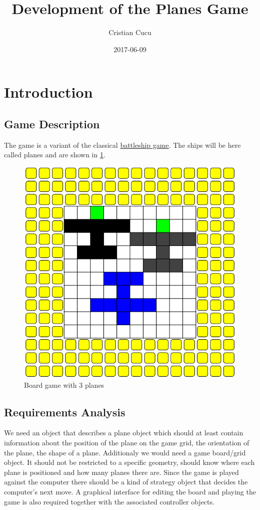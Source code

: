 \documentclass{article}
\title{Development of the Planes Game}
\date{2017-06-09}
\author{Cristian Cucu}
\begin{document}
\maketitle
\newpage
\lstset{language=C++}
\section{Introduction}

\subsection{Game Description}
The game is a variant of the classical \href{https://en.wikipedia.org/wiki/Battleship_(game)}{battleship game}. The ships will be here called planes and are shown in \ref{fig:board}.
\begin{figure}[h]
  \includegraphics[width = \textwidth]{BoardWithPlanes.png}
  \caption{Board game with 3 planes}
  \label{fig:board}
\end{figure}

\subsection{Requirements Analysis}
We need an object that describes a plane object which should at least contain information about the position of the plane on the game grid, the orientation of the plane, the shape of a plane. Additionaly we would need a game board/grid object. It should not be restricted to a specific geometry, should know where each plane is positioned and how many planes there are. Since the game is played against the computer there should be a kind of strategy object that decides the computer's next move.
A graphical interface for editing the board and playing the game is also required together with the associated controller objects.
\end{document}

